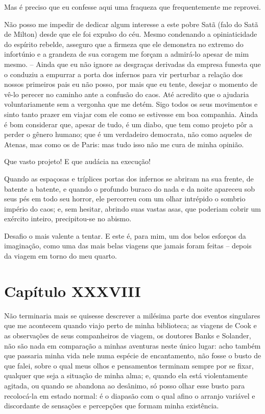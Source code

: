  Mas é preciso que eu confesse aqui uma fraqueza que frequentemente me reprovei. 

 Não posso me impedir de dedicar algum interesse a este pobre Satã (falo
do Satã de Milton) desde que ele foi expulso do céu. Mesmo condenando a
opiniaticidade do espírito rebelde, asseguro que a firmeza que ele
demonstra no extremo do infortúnio e a grandeza de sua coragem me
forçam a admirá-lo apesar de mim mesmo. -- Ainda que eu não ignore as
desgraças derivadas da empresa funesta que o conduziu a empurrar a
porta dos infernos para vir perturbar a relação dos nossos primeiros
pais eu não posso, por mais que eu tente, desejar o momento de vê-lo
perecer no caminho ante a confusão do caos. Até acredito que o ajudaria
voluntariamente sem a vergonha que me detém. Sigo todos os seus
movimentos e sinto tanto prazer em viajar com ele como se estivesse em
boa companhia. Ainda é bom considerar que, apesar de tudo, é um diabo,
que tem como projeto pôr a perder o gênero humano; que é um verdadeiro
democrata, não como aqueles de Atenas, mas como os de Paris: mas tudo
isso não me cura de minha opinião.

 Que vasto projeto! E que audácia na execução!

 Quando as espaçosas e tríplices portas dos infernos se abriram na sua
frente, de batente a batente, e quando o profundo buraco do nada e da
noite apareceu sob seus pés em todo seu horror, ele percorreu com um
olhar intrépido o sombrio império do caos; e, sem hesitar, abrindo suas
vastas asas, que poderiam cobrir um exército inteiro, precipitou-se no
abismo.

 Desafio o mais valente a tentar. E este é, para mim, um dos belos
esforços da imaginação, como uma das mais belas viagens que jamais
foram feitas -- depois da viagem em torno do meu quarto.

\section*{Capítulo XXXVIII}

 Não terminaria mais se quisesse descrever a milésima parte dos eventos
singulares que me acontecem quando viajo perto de minha biblioteca; as
viagens de Cook e as observações de seus companheiros de viagem, os
doutores Banks e Solander, não são nada em comparação a minhas
aventuras neste único lugar: acho também que passaria minha vida nele
numa espécie de encantamento, não fosse o busto de que falei, sobre o
qual meus olhos e pensamentos terminam sempre por se fixar, qualquer
que seja a situação de minha alma; e, quando ela está violentamente
agitada, ou quando se abandona ao desânimo, só posso olhar esse busto
para recolocá-la em estado normal: é o diapasão com o qual afino o
arranjo variável e discordante de sensações e percepções que formam
minha existência. 

